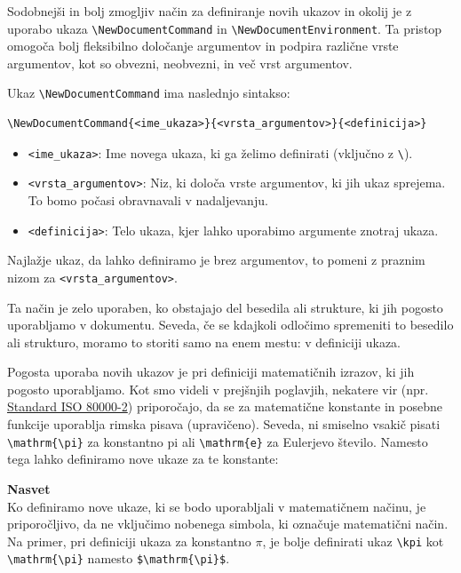 Sodobnejši in bolj zmogljiv način za definiranje novih ukazov in okolij je z uporabo ukaza \texttt{{\textbackslash}NewDocumentCommand} in \texttt{{\textbackslash}NewDocumentEnvironment}.
Ta pristop omogoča bolj fleksibilno določanje argumentov in podpira različne vrste argumentov, kot so obvezni, neobvezni, in več vrst argumentov.

Ukaz \texttt{{\textbackslash}NewDocumentCommand} ima naslednjo sintakso:

\begin{verbatim}
\NewDocumentCommand{<ime_ukaza>}{<vrsta_argumentov>}{<definicija>}
\end{verbatim}

\begin{itemize}
\item \texttt{\textless ime\_ukaza\textgreater }: Ime novega ukaza, ki ga želimo definirati (vključno z \texttt{{\textbackslash}}).
\item \texttt{\textless vrsta\_argumentov\textgreater }: Niz, ki določa vrste argumentov, ki jih ukaz sprejema. To bomo počasi obravnavali v nadaljevanju.
\item \texttt{\textless definicija\textgreater }: Telo ukaza, kjer lahko uporabimo argumente znotraj ukaza.
\end{itemize}

Najlažje ukaz, da lahko definiramo je brez argumentov, to pomeni z praznim nizom za \texttt{\textless vrsta\_argumentov\textgreater }.

Ta način je zelo uporaben, ko obstajajo del besedila ali strukture, ki jih pogosto uporabljamo v dokumentu.
Seveda, če se kdajkoli odločimo spremeniti to besedilo ali strukturo, moramo to storiti samo na enem mestu: v definiciji ukaza.

Pogosta uporaba novih ukazov je pri definiciji matematičnih izrazov, ki jih pogosto uporabljamo. Kot smo videli v prejšnjih poglavjih, nekatere vir (npr. \href{https://www.sist.si/velicine-in-enote-2-del-matematika-sist-en-iso-80000-220196-prevod-v-slovenscino.html}{Standard ISO 80000-2}) priporočajo, da se za matematične konstante in posebne funkcije uporablja rimska pisava (upravičeno).
Seveda, ni smiselno vsakič pisati \texttt{{\textbackslash}mathrm\{{\textbackslash}pi\}} za konstantno $\mathrm{pi}$ ali \texttt{{\textbackslash}mathrm\{e\}} za Eulerjevo število.
Namesto tega lahko definiramo nove ukaze za te konstante:

\begin{framed}
\textbf{Nasvet}\\
Ko definiramo nove ukaze, ki se bodo uporabljali v matematičnem načinu, je priporočljivo, da ne vključimo nobenega simbola, ki označuje matematični način.
Na primer, pri definiciji ukaza za konstantno $\pi$, je bolje definirati ukaz \texttt{{\textbackslash}kpi} kot \texttt{{\textbackslash}mathrm\{{\textbackslash}pi\}} namesto \texttt{\${\textbackslash}mathrm\{{\textbackslash}pi\}\$}.
\end{framed}

